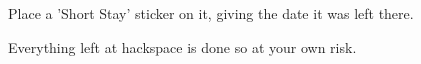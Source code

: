 {{Place a 'Short Stay' sticker on it, giving the date it was left there.} %

	}
	{%
	Everything left at hackspace is done so at your own risk.
	}
